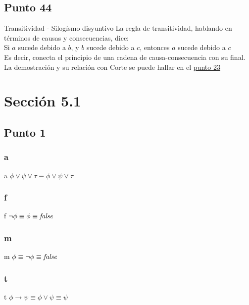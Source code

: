 \documentclass{article}
\begin{document}
\subsection{Punto 44}
\begin{logicenv}[10]{Transitividad - Silogísmo disyuntivo}
    La regla de transitividad, hablando en términos de causas y consecuencias, dice:\\
    Si $a$ sucede debido a $b$, y $b$ sucede debido a $c$, entonces $a$ sucede debido a $c$\\
    Es decir, conecta el principio de una cadena de causa-consecuencia con su final.
    La demostración y su relación con Corte se puede hallar en el \hyperref[Transitividad]{punto 23}
\end{logicenv}

\section{Sección 5.1}
\subsection{Punto 1}
\subsubsection{a}
\begin{logicenv}[5]{a}
    $\phi \lor \psi \lor \tau \equiv \phi \lor \psi \lor \tau$
\end{logicenv}

\subsubsection{f}
\begin{logicenv}[5]{f}
    $\neg \phi \equiv \phi \equiv \textrm{\textit{false}}$
\end{logicenv}

\subsubsection{m}
\begin{logicenv}[5]{m}
    $\phi \equiv \neg \phi \equiv \textrm{\textit{false}}$
\end{logicenv}

\subsubsection{t}
\begin{logicenv}[5]{t}
    $\phi \to \psi \equiv \phi \lor \psi \equiv \psi$
\end{logicenv}
\end{document}
